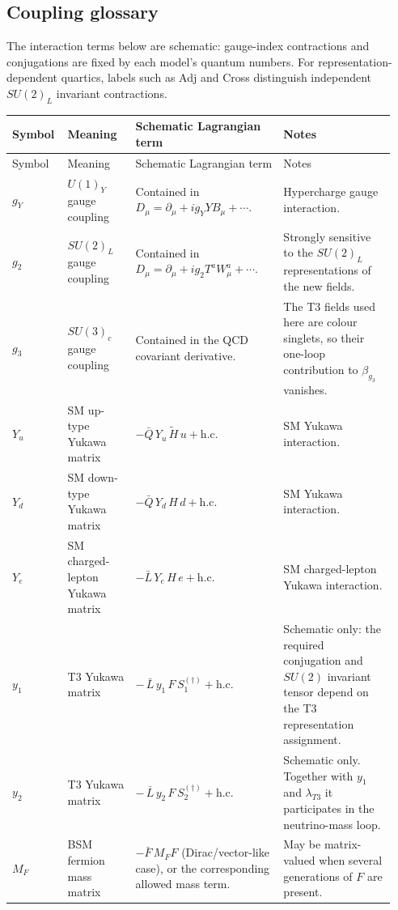 \documentclass{article}
\begin{document}
\begin{landscape}
\subsection*{Coupling glossary}
The interaction terms below are schematic: gauge-index contractions and conjugations are fixed by each model's quantum numbers. For representation-dependent quartics, labels such as Adj and Cross distinguish independent $SU(2)_L$ invariant contractions.
\begin{longtable}{@{}p{0.11\linewidth}p{0.17\linewidth}p{0.37\linewidth}p{0.29\linewidth}@{}}
\toprule
Symbol & Meaning & Schematic Lagrangian term & Notes \\
\midrule
\endfirsthead
\toprule
Symbol & Meaning & Schematic Lagrangian term & Notes \\
\midrule
\endhead
$g_Y$ & $U(1)_Y$ gauge coupling & Contained in $D_\mu=\partial_\mu+i g_Y Y B_\mu+\cdots$. & Hypercharge gauge interaction. \\
\midrule
$g_2$ & $SU(2)_L$ gauge coupling & Contained in $D_\mu=\partial_\mu+i g_2 T^a W^a_\mu+\cdots$. & Strongly sensitive to the $SU(2)_L$ representations of the new fields. \\
\midrule
$g_3$ & $SU(3)_c$ gauge coupling & Contained in the QCD covariant derivative. & The T3 fields used here are colour singlets, so their one-loop contribution to $\beta_{g_3}$ vanishes. \\
\midrule
$Y_u$ & SM up-type Yukawa matrix & $-\bar Q\,Y_u\,\widetilde H\,u+\mathrm{h.c.}$ & SM Yukawa interaction. \\
\midrule
$Y_d$ & SM down-type Yukawa matrix & $-\bar Q\,Y_d\,H\,d+\mathrm{h.c.}$ & SM Yukawa interaction. \\
\midrule
$Y_e$ & SM charged-lepton Yukawa matrix & $-\bar L\,Y_e\,H\,e+\mathrm{h.c.}$ & SM charged-lepton Yukawa interaction. \\
\midrule
$y_1$ & T3 Yukawa matrix & $-\,\bar L\,y_1\,F\,S_1^{(\dagger)}+\mathrm{h.c.}$ & Schematic only: the required conjugation and $SU(2)$ invariant tensor depend on the T3 representation assignment. \\
\midrule
$y_2$ & T3 Yukawa matrix & $-\,\bar L\,y_2\,F\,S_2^{(\dagger)}+\mathrm{h.c.}$ & Schematic only. Together with $y_1$ and $\lambda_{T3}$ it participates in the neutrino-mass loop. \\
\midrule
$M_F$ & BSM fermion mass matrix & $-\bar F\,M_F F$ (Dirac/vector-like case), or the corresponding allowed mass term. & May be matrix-valued when several generations of $F$ are present. \\

\end{longtable}
\end{landscape}
\end{document}

